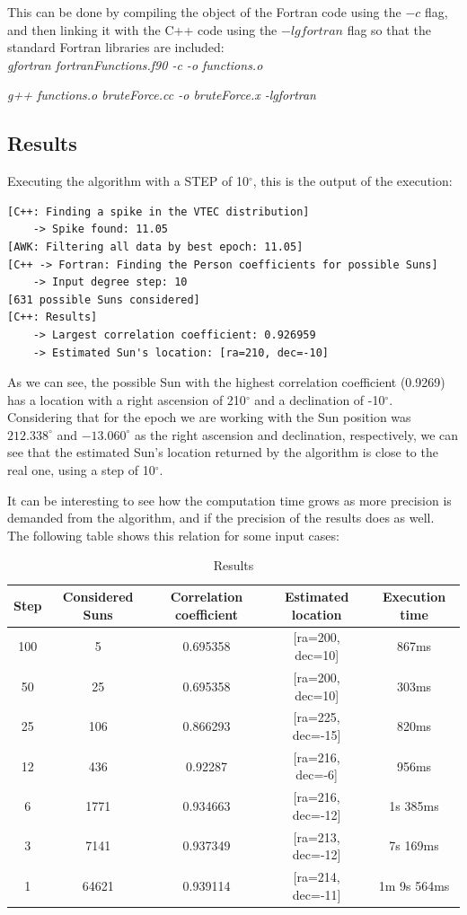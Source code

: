 This can be done by compiling the object of the Fortran code using the $-c$ flag, and then linking it with the C++ code using the $-lgfortran$ flag so that the standard Fortran libraries are included: \\

\textit{gfortran fortranFunctions.f90 -c -o functions.o}
	
\textit{g++ functions.o bruteForce.cc -o bruteForce.x -lgfortran}

\subsection{Results}

Executing the algorithm with a STEP of 10$^{\circ}$, this is the output of the execution:

\begin{lstlisting}[caption=Brute force approach algorithm output]
[C++: Finding a spike in the VTEC distribution]
	-> Spike found: 11.05
[AWK: Filtering all data by best epoch: 11.05]
[C++ -> Fortran: Finding the Person coefficients for possible Suns]
	-> Input degree step: 10
[631 possible Suns considered]
[C++: Results]
	-> Largest correlation coefficient: 0.926959
	-> Estimated Sun's location: [ra=210, dec=-10]
\end{lstlisting}

As we can see, the possible Sun with the highest correlation coefficient (0.9269) has a location with a right ascension of 210$^{\circ}$ and a declination of -10$^{\circ}$. Considering that for the epoch we are working with the Sun position was $212.338^{\circ}$ and $-13.060^{\circ}$ as the right ascension and declination, respectively, we can see that the estimated Sun's location returned by the algorithm is close to the real one, using a step of 10$^{\circ}$.

It can be interesting to see how the computation time grows as more precision is demanded from the algorithm, and if the precision of the results does as well. The following table shows this relation for some input cases:

\begin{table}[h!]
	\centering
	\def\arraystretch{1.2}
	\begin{tabular}{|c c c c c|} 
		\hline
		Step & Considered Suns & Correlation coefficient & Estimated location & Execution time \\ [0.5ex] 
		\hline\hline
		100 & 5 & 0.695358 & [ra=200, dec=10] & 867ms \\
		\hline 
		50 & 25 & 0.695358 & [ra=200, dec=10] & 303ms \\
			\hline 
		25 & 106 & 0.866293 & [ra=225, dec=-15] & 820ms \\
			\hline 
		12 & 436 & 0.92287 & [ra=216, dec=-6] & 956ms \\
			\hline 
		6 & 1771 & 0.934663 & [ra=216, dec=-12] & 1s 385ms \\
			\hline 
		3 & 7141 & 0.937349 & [ra=213, dec=-12] & 7s 169ms \\
			\hline 
		1 & 64621 & 0.939114 & [ra=214, dec=-11] & 1m 9s 564ms \\
		\hline 
	\end{tabular}
	\caption{Results}
\end{table}

